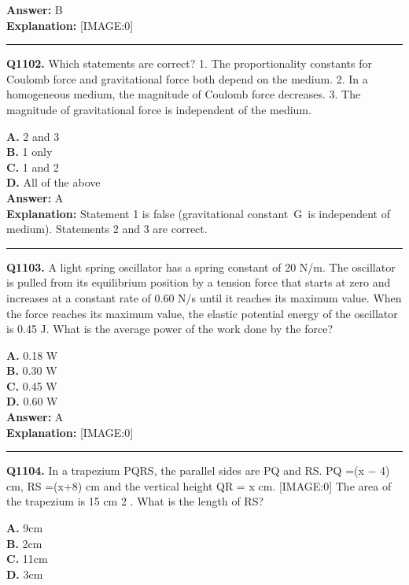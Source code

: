 \documentclass[12pt]{article}
\begin{document}
\textbf{Answer:} B \\
\textbf{Explanation:} [IMAGE:0]

\hrule
\vspace{1em}


\noindent
\textbf{Q1102.} Which statements are correct?
1.
The proportionality constants for Coulomb force and gravitational force both depend on the medium.
2.
In a homogeneous medium, the magnitude of Coulomb force decreases.
3. The magnitude of gravitational force is independent of the medium.



\textbf{A.} 2 and 3 \\
\textbf{B.} 1 only \\
\textbf{C.} 1 and 2 \\
\textbf{D.} All of the above \\

\textbf{Answer:} A \\
\textbf{Explanation:} Statement 1 is false (gravitational constant G is independent of medium). Statements 2 and 3 are correct.

\hrule
\vspace{1em}


\noindent
\textbf{Q1103.} A light spring oscillator has a spring constant of 20 N/m. The oscillator is pulled from its equilibrium position by a tension force that starts at zero and increases at a constant rate of 0.60 N/s until it reaches its maximum value. When the force reaches its maximum value, the elastic potential energy of the oscillator is 0.45 J. What is the average power of the work done by the force?



\textbf{A.} 0.18 W \\
\textbf{B.} 0.30 W \\
\textbf{C.} 0.45 W \\
\textbf{D.} 0.60 W \\

\textbf{Answer:} A \\
\textbf{Explanation:} [IMAGE:0]

\hrule
\vspace{1em}


\noindent
\textbf{Q1104.} In a trapezium PQRS, the parallel sides are PQ and RS. PQ =(x
−
4) cm, RS =(x+8) cm and the vertical height QR = x cm.
[IMAGE:0]
The area of the trapezium is 15 cm
2
. What is the length of RS?



\textbf{A.} 9cm \\
\textbf{B.} 2cm \\
\textbf{C.} 11cm \\
\textbf{D.} 3cm \\
\end{document}
